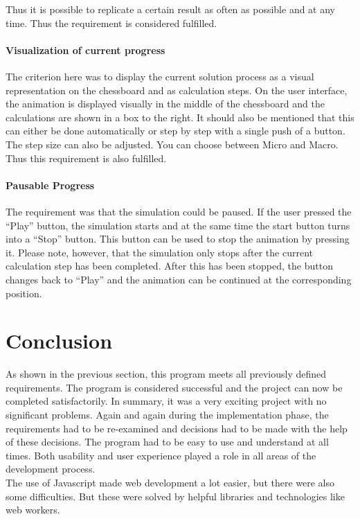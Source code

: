 Thus it is possible to replicate a certain result as often as possible and at any time. Thus the requirement is considered fulfilled.
\paragraph{Visualization of current progress}
The criterion here was to display the current solution process as a visual representation on the chessboard and as calculation steps. On the user interface, the animation is displayed visually in the middle of the chessboard and the calculations are shown in a box to the right. It should also be mentioned that this can either be done automatically or step by step with a single push of a button. The step size can also be adjusted. You can choose between Micro and Macro. Thus this requirement is also fulfilled.
\paragraph{Pausable Progress}
The requirement was that the simulation could be paused. If the user pressed the \enquote{Play} button, the simulation starts and at the same time the start button turns into a \enquote{Stop} button. This button can be used to stop the animation by pressing it. Please note, however, that the simulation only stops after the current calculation step has been completed. After this has been stopped, the button changes back to \enquote{Play} and the animation can be continued at the corresponding position.
\section{Conclusion}
As shown in the previous section, this program meets all previously defined requirements. The program is considered successful and the project can now be completed satisfactorily. In summary, it was a very exciting project with no significant problems. Again and again during the implementation phase, the requirements had to be re-examined and decisions had to be made with the help of these decisions. The program had to be easy to use and understand at all times. Both usability and user experience played a role in all areas of the development process. 
\\
The use of Javascript made web development a lot easier, but there were also some difficulties. But these were solved by helpful libraries and technologies like web workers. 
